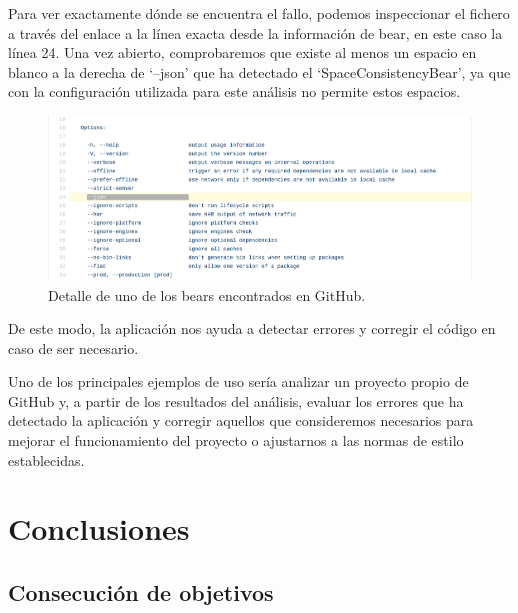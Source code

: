 \documentclass[a4paper, 12pt]{book}
\begin{document}
Para ver exactamente dónde se encuentra el fallo, podemos inspeccionar el fichero a través del enlace a la línea exacta desde la información de bear, en este caso la línea 24. Una vez abierto, comprobaremos que existe al menos un espacio en blanco a la derecha de `--json' que ha detectado el `SpaceConsistencyBear', ya que con la configuración utilizada para este análisis no permite estos espacios.

\begin{figure}[H]
  \centering
  \includegraphics[width=17cm, keepaspectratio]{img/bearDataGitHub}
  \caption{Detalle de uno de los bears encontrados en GitHub.}
  \label{fig:bearDataGitHub}
\end{figure}

De este modo, la aplicación nos ayuda a detectar errores y corregir el código en caso de ser necesario. 

Uno de los principales ejemplos de uso sería analizar un proyecto propio de GitHub y, a partir de los resultados del análisis, evaluar los errores que ha detectado la aplicación y corregir aquellos que consideremos necesarios para mejorar el funcionamiento del proyecto o ajustarnos a las normas de estilo establecidas.


\cleardoublepage
\chapter{Conclusiones}
\label{chap:conclusiones}


\section{Consecución de objetivos}
\label{sec:consecucion-objetivos}
\end{document}
